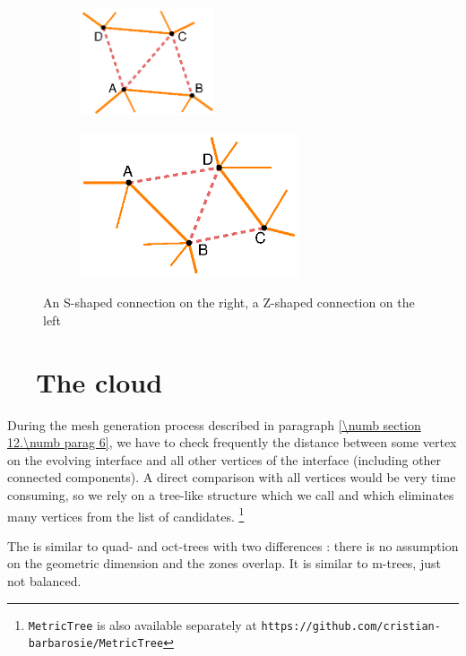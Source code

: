 \begin{figure}[ht] \centering
\begin{subfigure}{45mm}\centering
  \includegraphics[width=40mm]{connect-S}
\end{subfigure}  
\begin{subfigure}{70mm}\centering
  \includegraphics[width=65mm]{connect-Z}
\end{subfigure}  
  \caption{An S-shaped connection on the right, a Z-shaped connection on the left}
  \label{\numb section 12.\numb fig 8}
\end{figure}


\section{~~The cloud}\label{\numb section 12.\numb parag 10}

During the mesh generation process described in paragraph \ref{\numb section 12.\numb parag 6},
we have to check frequently the distance between
some vertex on the evolving interface and all other vertices of the interface
(including other connected components).
A direct comparison with all vertices would be very time consuming, so we rely on a tree-like
structure which we call {\small\tt{}} and which eliminates many vertices from the list
of candidates.%
\footnote {{} {\footnotesize\tt MetricTree} is also available separately at
{\footnotesize\tt https://github.com/cristian-barbarosie/MetricTree}}

The {\small\tt{}} is similar to quad- and oct-trees with two differences :
there is no assumption on the geometric dimension and the zones overlap.
It is similar to m-trees, just not balanced.

